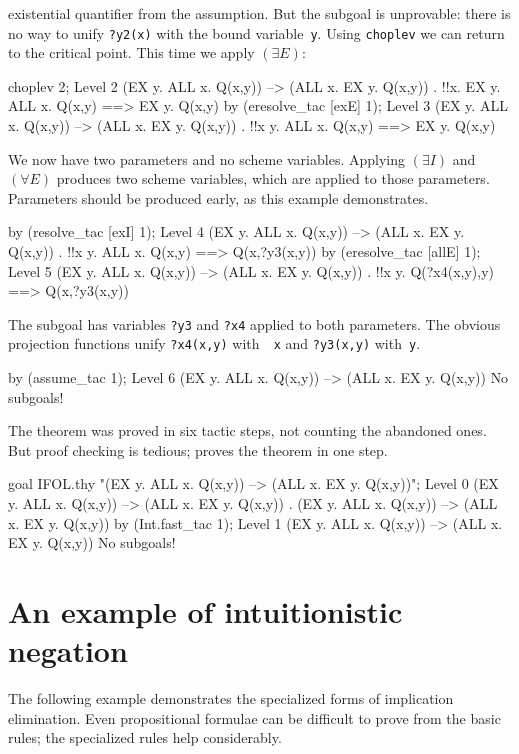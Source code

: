 existential quantifier from the assumption.  But the subgoal is unprovable:
there is no way to unify {\tt ?y2(x)} with the bound variable~{\tt y}.
Using {\tt choplev} we can return to the critical point.  This time we
apply $({\exists}E)$:
\begin{ttbox}
choplev 2;
{\out Level 2}
{\out (EX y. ALL x. Q(x,y)) --> (ALL x. EX y. Q(x,y))}
{. !!x. EX y. ALL x. Q(x,y) ==> EX y. Q(x,y)}
\ttbreak
by (eresolve_tac [exE] 1);
{\out Level 3}
{\out (EX y. ALL x. Q(x,y)) --> (ALL x. EX y. Q(x,y))}
{. !!x y. ALL x. Q(x,y) ==> EX y. Q(x,y)}
\end{ttbox}
We now have two parameters and no scheme variables.  Applying
$({\exists}I)$ and $({\forall}E)$ produces two scheme variables, which are
applied to those parameters.  Parameters should be produced early, as this
example demonstrates.
\begin{ttbox}
by (resolve_tac [exI] 1);
{\out Level 4}
{\out (EX y. ALL x. Q(x,y)) --> (ALL x. EX y. Q(x,y))}
{. !!x y. ALL x. Q(x,y) ==> Q(x,?y3(x,y))}
\ttbreak
by (eresolve_tac [allE] 1);
{\out Level 5}
{\out (EX y. ALL x. Q(x,y)) --> (ALL x. EX y. Q(x,y))}
{. !!x y. Q(?x4(x,y),y) ==> Q(x,?y3(x,y))}
\end{ttbox}
The subgoal has variables {\tt ?y3} and {\tt ?x4} applied to both
parameters.  The obvious projection functions unify {\tt?x4(x,y)} with~{\tt
x} and \verb|?y3(x,y)| with~{\tt y}.
\begin{ttbox}
by (assume_tac 1);
{\out Level 6}
{\out (EX y. ALL x. Q(x,y)) --> (ALL x. EX y. Q(x,y))}
{\out No subgoals!}
\end{ttbox}
The theorem was proved in six tactic steps, not counting the abandoned
ones.  But proof checking is tedious;  proves the
theorem in one step.
\begin{ttbox}
goal IFOL.thy "(EX y. ALL x. Q(x,y)) -->  (ALL x. EX y. Q(x,y))";
{\out Level 0}
{\out (EX y. ALL x. Q(x,y)) --> (ALL x. EX y. Q(x,y))}
{. (EX y. ALL x. Q(x,y)) --> (ALL x. EX y. Q(x,y))}
by (Int.fast_tac 1);
{\out Level 1}
{\out (EX y. ALL x. Q(x,y)) --> (ALL x. EX y. Q(x,y))}
{\out No subgoals!}
\end{ttbox}


\section{An example of intuitionistic negation}
The following example demonstrates the specialized forms of implication
elimination.  Even propositional formulae can be difficult to prove from
the basic rules; the specialized rules help considerably.  

